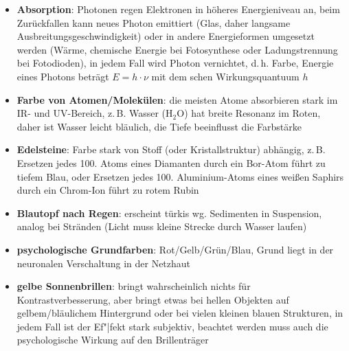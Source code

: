 \begin{itemize}
    \item
    \textbf{Absorption}:
    Photonen regen Elektronen in höheres Energieniveau an, beim Zurückfallen
    kann neues Photon emittiert (Glas, daher
    langsame Ausbreitungsgeschwindigkeit) oder in andere Energieformen
    umgesetzt werden (Wärme, chemische Energie bei Fotosynthese oder
    Ladungstrennung bei Fotodioden), in jedem Fall wird Photon vernichtet,
    d.\,h. Farbe, Energie eines Photons beträgt $E = h \cdot \nu$ mit
    dem schen Wirkungsquantuum $h$
    
    \item
    \textbf{Farbe von Atomen/Molekülen}:
    die meisten Atome absorbieren stark im IR- und UV-Bereich, z.\,B.
    Wasser ($\text{H}_2 \text{O}$) hat breite Resonanz im Roten, daher ist
    Wasser leicht bläulich, die Tiefe beeinflusst die Farbstärke
    
    \item
    \textbf{Edelsteine}:
    Farbe stark von Stoff (oder Kristallstruktur) abhängig, z.\,B.
    Ersetzen jedes 100. Atoms eines Diamanten durch ein Bor-Atom führt zu
    tiefem Blau, oder Ersetzen jedes 100. Aluminium-Atoms eines weißen Saphirs
    durch ein Chrom-Ion führt zu rotem Rubin
    
    \item
    \textbf{Blautopf nach Regen}:
    erscheint türkis wg. Sedimenten in Suspension, analog bei Stränden
    (Licht muss kleine Strecke durch Wasser laufen)
\end{itemize}
\linie
\begin{itemize}
    \item
    \textbf{psychologische Grundfarben}:
    Rot/Gelb/Grün/Blau,
    Grund liegt in der neuronalen Verschaltung in der Netzhaut
    
    \item
    \textbf{gelbe Sonnenbrillen}:
    bringt wahrscheinlich nichts für Kontrastverbesserung, aber
    bringt etwas bei hellen Objekten auf gelbem/bläulichem Hintergrund
    oder bei vielen kleinen blauen Strukturen,
    in jedem Fall ist der Ef"|fekt stark subjektiv,
    beachtet werden muss auch die psychologische Wirkung auf den Brillenträger
\end{itemize}
\linie
\pagebreak
